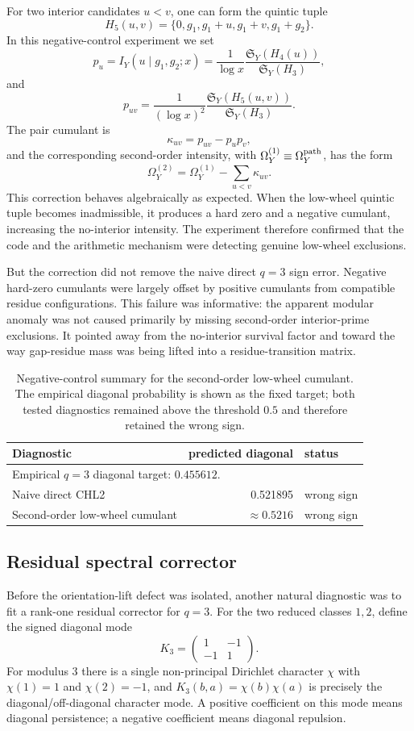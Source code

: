 \documentclass[10pt]{article}
\newcommand{\SY}{\mathfrak{S}_Y}
\begin{document}
For two interior candidates $u<v$, one can form the quintic tuple
\[
H_5(u,v)=\{0,g_1,g_1+u,g_1+v,g_1+g_2\}.
\]
In this negative-control experiment we set
\[
p_u=I_Y(u\mid g_1,g_2;x)=\frac{1}{\log x}\frac{\SY(H_4(u))}{\SY(H_3)},
\]
and
\[
p_{uv}=\frac{1}{(\log x)^2}\frac{\SY(H_5(u,v))}{\SY(H_3)}.
\]
The pair cumulant is
\[
\kappa_{uv}=p_{uv}-p_up_v,
\]
and the corresponding second-order intensity, with $\Omega_Y^{(1)}\equiv\Omega_Y^{\rm path}$, has the form
\[
\Omega_Y^{(2)}=\Omega_Y^{(1)}-\sum_{u<v}\kappa_{uv}.
\]
This correction behaves algebraically as expected.  When the low-wheel quintic tuple becomes inadmissible, it produces a hard zero and a negative cumulant, increasing the no-interior intensity.  The experiment therefore confirmed that the code and the arithmetic mechanism were detecting genuine low-wheel exclusions.

But the correction did not remove the naive direct $q=3$ sign error.  Negative hard-zero cumulants were largely offset by positive cumulants from compatible residue configurations.  This failure was informative: the apparent modular anomaly was not caused primarily by missing second-order interior-prime exclusions.  It pointed away from the no-interior survival factor and toward the way gap-residue mass was being lifted into a residue-transition matrix.

\begin{table}[H]\centering\small
\begin{tabular}{lrl}
\toprule
Diagnostic & predicted diagonal & status \\
\midrule
\multicolumn{3}{l}{Empirical $q=3$ diagonal target: $0.455612$.}\\
\midrule
Naive direct CHL2 & 0.521895 & wrong sign \\
Second-order low-wheel cumulant & $\approx0.5216$ & wrong sign \\
\bottomrule
\end{tabular}
\caption{Negative-control summary for the second-order low-wheel cumulant.  The empirical diagonal probability is shown as the fixed target; both tested diagnostics remained above the threshold $0.5$ and therefore retained the wrong sign.}
\end{table}

\subsection{Residual spectral corrector}
Before the orientation-lift defect was isolated, another natural diagnostic was to fit a rank-one residual corrector for $q=3$.  For the two reduced classes $1,2$, define the signed diagonal mode
\[
K_3=\begin{pmatrix}1&-1\\-1&1\end{pmatrix}.
\]
For modulus $3$ there is a single non-principal Dirichlet character $\chi$ with $\chi(1)=1$ and $\chi(2)=-1$, and $K_3(b,a)=\chi(b)\chi(a)$ is precisely the diagonal/off-diagonal character mode.  A positive coefficient on this mode means diagonal persistence; a negative coefficient means diagonal repulsion.
\end{document}
